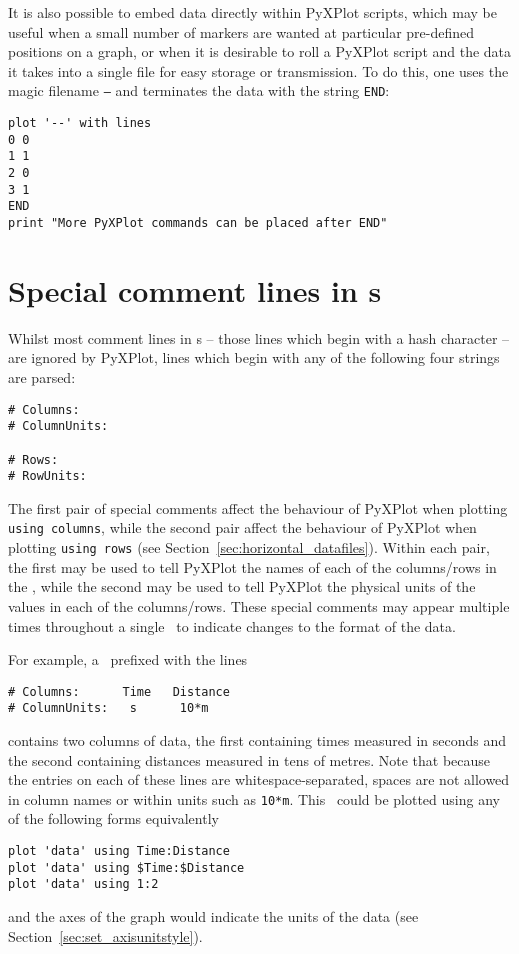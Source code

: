 It is also possible to embed data directly within PyXPlot scripts, which may be
useful when a small number of markers are wanted at particular pre-defined
positions on a graph, or when it is desirable to roll a PyXPlot script and the
data it takes into a single file for easy storage or transmission. To do this,
one uses the magic filename {\tt --} and terminates the data with the string
{\tt END}:

\begin{verbatim}
plot '--' with lines
0 0
1 1
2 0
3 1
END
print "More PyXPlot commands can be placed after END"
\end{verbatim}

\section{Special comment lines in \datafile s}
\label{sec:special_comments}

Whilst most comment lines in \datafile s -- those lines which begin with a hash
character -- are ignored by PyXPlot, lines which begin with any of the
following four strings are parsed:
\begin{verbatim}
# Columns:
# ColumnUnits:

# Rows:
# RowUnits:
\end{verbatim}
The first pair of special comments affect the behaviour of PyXPlot when
plotting {\tt using columns}, while the second pair affect the behaviour of
PyXPlot when plotting {\tt using rows} (see
Section~\ref{sec:horizontal_datafiles}). Within each pair, the first may be
used to tell PyXPlot the names of each of the columns/rows in the \datafile,
while the second may be used to tell PyXPlot the physical units of the values
in each of the columns/rows. These special comments may appear multiple times
throughout a single \datafile\ to indicate changes to the format of the data.

For example, a \datafile\ prefixed with the lines
\begin{verbatim}
# Columns:      Time   Distance
# ColumnUnits:   s      10*m
\end{verbatim}
contains two columns of data, the first containing times measured in seconds
and the second containing distances measured in tens of metres. Note that
because the entries on each of these lines are whitespace-separated, spaces are
not allowed in column names or within units such as {\tt 10*m}. This \datafile\
could be plotted using any of the following forms equivalently
\begin{verbatim}
plot 'data' using Time:Distance
plot 'data' using $Time:$Distance
plot 'data' using 1:2
\end{verbatim}
and the axes of the graph would indicate the units of the data (see
Section~\ref{sec:set_axisunitstyle}).

